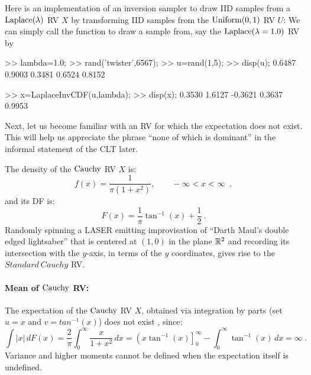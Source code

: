 \begin{simulation}[$\laplace(\lambda)$] \label{SIM:Laplace}
Here is an implementation of an inversion sampler to draw IID samples from a $\laplace(\lambda)$ RV $X$ by transforming IID samples from the $\mbox{{\rm Uniform}}(0,1)$ RV $U$:
We can simply call the function to draw a sample from, say the $\mbox{{\rm Laplace}}(\lambda=1.0)$ RV by
\begin{VrbM}
>> lambda=1.0;		%
>> rand('twister',6567);        %
>> u=rand(1,5);		%
>> disp(u);		%
    0.6487    0.9003    0.3481    0.6524    0.8152

>> x=LaplaceInvCDF(u,lambda); %
>> disp(x);                     %
    0.3530    1.6127   -0.3621    0.3637    0.9953
\end{VrbM}
\end{simulation}


Next, let us become familiar with an RV for which the expectation does not exist.  This will help us appreciate the phrase ``none of which is dominant'' in the informal statement of the CLT later.
\begin{model}[$\cauchy$]
The density of the $\cauchy$ RV $X$ is:
\begin{equation}\label{E:StandardCauchypdf}
f(x) = \frac{1}{\pi (1+x^2)}, \qquad -\infty < x < \infty \enspace ,
\end{equation}
and its DF is:
\begin{equation}\label{E:StandardCauchycdf}
F(x) = \frac{1}{\pi} \tan^{-1} (x) + \frac{1}{2} \ .
\end{equation}
Randomly spinning a LASER emitting improvisation of ``Darth Maul's double edged lightsaber'' that is centered at $(1,0)$ in the plane $\mathbb{R}^2$ and recording its intersection with the $y$-axis, in terms of the $y$ coordinates, gives rise to the $Standard~Cauchy$ RV.
\end{model}

\paragraph{Mean of $\cauchy$ RV:}
The expectation of the $\cauchy$ RV $X$, obtained via integration by parts (set $u=x$ and $v=tan^{-1}(x)$) does not exist  %
, since:
\begin{equation}\label{E:CauchyMeanDoesNotExist}
\int \left|x\right|\,dF(x) = \frac{2}{\pi} \int_0^{\infty} \frac{x}{1+x^2}\,dx = \left(x \tan^{-1}(x) \right]_0^{\infty} - \int_0^{\infty} \tan^{-1}(x)\, dx = \infty \ .
\end{equation}
Variance and higher moments cannot be defined when the expectation itself is undefined.

